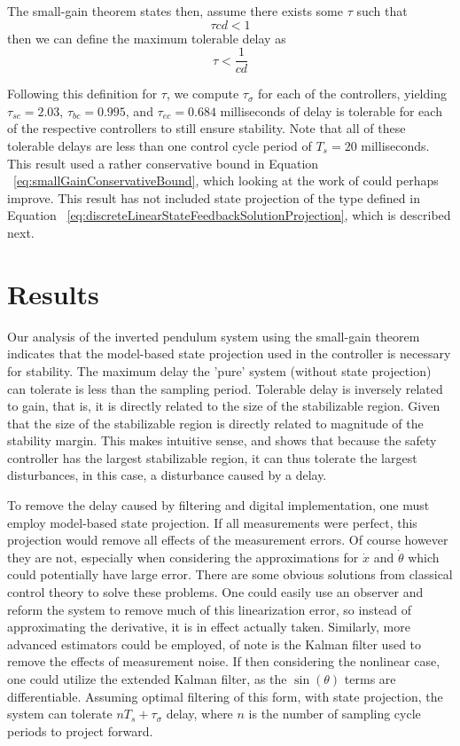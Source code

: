 \documentclass[conference]{IEEEtran}
\begin{document}
The small-gain theorem states then, assume there exists some $\tau$ such that
\begin{equation}
\tau cd<1
\end{equation}
then we can define the maximum tolerable delay as 
\begin{equation}
\tau<\frac{1}{cd}
\end{equation}

Following this definition for $\tau$, we compute $\tau_{\sigma}$ for each of the controllers, yielding $\tau_{sc}=2.03$, $\tau_{bc}=0.995$, and $\tau_{ec}=0.684$ milliseconds of delay is tolerable for each of the respective controllers to still ensure stability.  Note that all of these tolerable delays are less than one control cycle period of $T_s=20$ milliseconds.  This result used a rather conservative bound in Equation ~\ref{eq:smallGainConservativeBound}, which looking at the work of \cite{Fridman2008} could perhaps improve.  This result has not included state projection of the type defined in Equation ~\ref{eq:discreteLinearStateFeedbackSolutionProjection}, which is described next.

\section{Results}
Our analysis of the inverted pendulum system using the small-gain theorem indicates that the model-based state projection used in the controller is necessary for stability.  The maximum delay the 'pure' system (without state projection) can tolerate is less than the sampling period.  Tolerable delay is inversely related to gain, that is, it is directly related to the size of the stabilizable region.  Given that the size of the stabilizable region is directly related to magnitude of the stability margin.  This makes intuitive sense, and shows that because the safety controller has the largest stabilizable region, it can thus tolerate the largest disturbances, in this case, a disturbance caused by a delay.


To remove the delay caused by filtering and digital implementation, one must employ model-based state projection.  If all measurements were perfect, this projection would remove all effects of the measurement errors.  Of course however they are not, especially when considering the approximations for $\dot{x}$ and $\dot{\theta}$ which could potentially have large error.  There are some obvious solutions from classical control theory to solve these problems.  One could easily use an observer and reform the system to remove much of this linearization error, so instead of approximating the derivative, it is in effect actually taken.  Similarly, more advanced estimators could be employed, of note is the Kalman filter used to remove the effects of measurement noise.  If then considering the nonlinear case, one could utilize the extended Kalman filter, as the $\sin\left(\theta\right)$ terms are differentiable.  Assuming optimal filtering of this form, with state projection, the system can tolerate $nT_s+\tau_{\sigma}$ delay, where $n$ is the number of sampling cycle periods to project forward.
\end{document}

